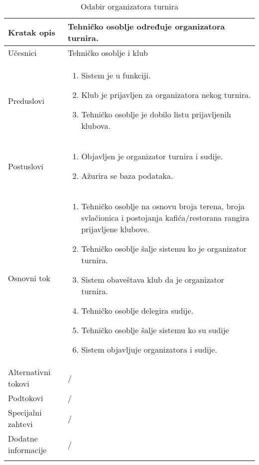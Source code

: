 \documentclass{article}
\begin{document}
    \begin{longtable}{| p{} | p{} |} 
        \hline
            Kratak opis & Tehničko osoblje određuje organizatora turnira.\\ 
        \hline    
            U\v{c}esnici & Tehničko osoblje i klub\\
        \hline
            Preduslovi & 
                \begin{enumerate}
                    \item Sistem je u funkciji.
                    \item Klub je prijavljen za organizatora nekog turnira.
                    \item Tehničko osoblje je dobilo listu prijavljenih klubova.
                \end{enumerate}\\
        \hline  
            Postuslovi & 
                \begin{enumerate}
                    \item Objavljen je organizator turnira i sudije.
                    \item Ažurira se baza podataka.
                \end{enumerate}\\
        \hline
            Osnovni tok & 
                \begin{enumerate}
                    \item Tehničko osoblje na osnovu broja terena, broja svlačionica i postojanja kafića/restorana rangira prijavljene klubove.
                    \item Tehničko osoblje šalje sistemu ko je organizator turnira.
                    \item Sistem obaveštava klub da je organizator turnira.
                    \item Tehničko osoblje delegira sudije.
                    \item Tehničko osoblje šalje sistemu ko su sudije
                    \item Sistem objavljuje organizatora i sudije.
                \end{enumerate}\\
        \hline
            Alternativni tokovi & /\\
        \hline
            Podtokovi & /\\
        \hline
            Specijalni zahtevi & /\\
        \hline
            Dodatne informacije & /\\
        \hline    
        \caption{Odabir organizatora turnira}
    \end{longtable}
\end{document}
